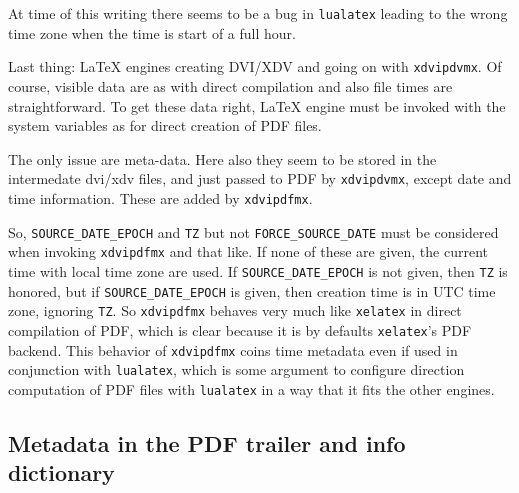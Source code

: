 \documentclass[a4paper]{article}%
\newcommand{\lualatex}{\texttt{lualatex}}
\newcommand{\xelatex}{\texttt{xelatex}}
\begin{document}
At time of this writing there seems to be a bug in \lualatex{} 
leading to the wrong time zone 
when the time is start of a full hour. 



Last thing: 
\LaTeX{} engines creating DVI/XDV and going on with \texttt{xdvipdvmx}. 
Of course, visible data are as with direct compilation and also file times are straightforward. 
To get these data right, \LaTeX{} engine must be invoked with the system variables 
as for direct creation of PDF files. 

The only issue are meta-data. 
Here also they seem to be stored in the intermedate dvi/xdv files, 
and just passed to PDF by \texttt{xdvipdvmx}, 
except date and time information. 
These are added by \texttt{xdvipdfmx}. 

So, \texttt{SOURCE\_DATE\_EPOCH} and \texttt{TZ} but not \texttt{FORCE\_SOURCE\_DATE} 
must be considered when invoking \texttt{xdvipdfmx} and that like. 
If none of these are given, the current time with local time zone are used. 
If \texttt{SOURCE\_DATE\_EPOCH} is not given, then \texttt{TZ} is honored, 
but if \texttt{SOURCE\_DATE\_EPOCH} is given, then creation time is in UTC time zone, 
ignoring \texttt{TZ}. 
So \texttt{xdvipdfmx} behaves very much like \xelatex{} in direct compilation of PDF, 
which is clear because it is by defaults \xelatex's PDF backend. 
This behavior of \texttt{xdvipdfmx} coins time metadata even if used in conjunction with \lualatex, 
which is some argument to configure direction computation of PDF files with \lualatex{} 
in a way that it fits the other engines. 



\subsection{Metadata in the PDF trailer and info dictionary}\label{subsec:trailerInfoDict}
\end{document}
